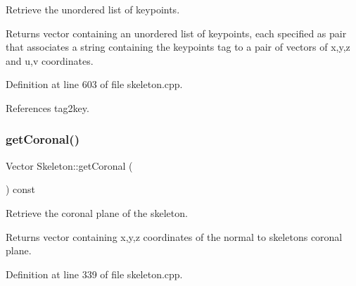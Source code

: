 Retrieve the unordered list of keypoints. 

\begin{DoxyReturn}{Returns}
vector containing an unordered list of keypoints, each specified as pair that associates a string containing the keypoint\textquotesingle{}s tag to a pair of vectors of x,y,z and u,v coordinates. 
\end{DoxyReturn}


Definition at line 603 of file skeleton.\+cpp.


\begin{DoxyCode}{0}

\end{DoxyCode}


References tag2key.

\mbox{\label{classassistive__rehab_1_1Skeleton_aa241a0ac93a9ead198f985073c8935eb}} 
\subsubsection{\texorpdfstring{getCoronal()}{getCoronal()}}
{\footnotesize\ttfamily Vector Skeleton\+::get\+Coronal (\begin{DoxyParamCaption}{ }\end{DoxyParamCaption}) const}



Retrieve the coronal plane of the skeleton. 

\begin{DoxyReturn}{Returns}
vector containing x,y,z coordinates of the normal to skeleton\textquotesingle{}s coronal plane. 
\end{DoxyReturn}


Definition at line 339 of file skeleton.\+cpp.


\begin{DoxyCode}{0}

\end{DoxyCode}


